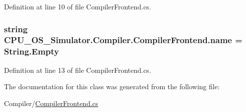 Definition at line 10 of file Compiler\+Frontend.\+cs.

\hypertarget{class_c_p_u___o_s___simulator_1_1_compiler_1_1_compiler_frontend_a2b4facf897341f61d4db60dc7fdc67c4}{}
\subsubsection[{name}]{\setlength{\rightskip}{0pt plus 5cm}string C\+P\+U\+\_\+\+O\+S\+\_\+\+Simulator.\+Compiler.\+Compiler\+Frontend.\+name = String.\+Empty\hspace{0.3cm}{\ttfamily [private]}}\label{class_c_p_u___o_s___simulator_1_1_compiler_1_1_compiler_frontend_a2b4facf897341f61d4db60dc7fdc67c4}


Definition at line 13 of file Compiler\+Frontend.\+cs.



The documentation for this class was generated from the following file\+:\begin{DoxyCompactItemize}
\item 
Compiler/\hyperlink{_compiler_frontend_8cs}{Compiler\+Frontend.\+cs}\end{DoxyCompactItemize}
